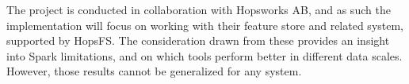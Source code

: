 The project is conducted in collaboration with Hopsworks \gls{AB}, and as such the implementation will focus on working with their feature store and related system, supported by \gls{HopsFS}. The consideration drawn from these provides an insight into Spark limitations, and on which tools perform better in different data scales. However, those results cannot be generalized for any system.